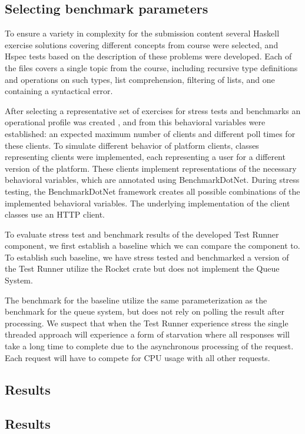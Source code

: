 \subsection{Selecting benchmark parameters}
To ensure a variety in complexity for the submission content several Haskell exercise solutions covering different concepts from course were selected, and Hspec tests based on the description of these problems were developed.  
Each of the files covers a single topic from the course, including recursive type definitions and operations on such types, list comprehension, filtering of lists, and one containing a syntactical error.

After selecting a representative set of exercises for stress tests and benchmarks an operational profile was created , and from this behavioral variables were established: an expected maximum number of clients and different poll times for these clients.
To simulate different behavior of platform clients, classes representing clients were implemented, each representing a user for a different version of the platform.
These clients implement representations of the necessary behavioral variables, which are annotated using BenchmarkDotNet.
During stress testing, the BenchmarkDotNet framework creates all possible combinations of the implemented behavioral variables.
The underlying implementation of the client classes use an HTTP client.

To evaluate stress test and benchmark results of the developed Test Runner component, we first establish a baseline which we can compare the component to. To establish such baseline, we have stress tested and benchmarked a version of the Test Runner utilize the Rocket crate but does not implement the Queue System. 


The benchmark for the baseline utilize the same parameterization as the benchmark for the queue system, but does not rely on polling the result after processing. 
We suspect that when the Test Runner experience stress the single threaded approach will experience a form of starvation where all responses will take a long time to complete due to the asynchronous processing of the request. Each request will have to compete for CPU usage with all other requests. 

\subsection{Results}













\subsection{Results}


